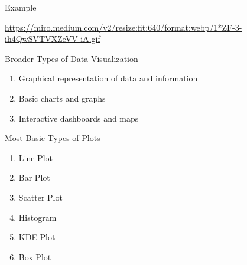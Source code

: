 \documentclass[aspectratio=169,xcolor=dvipsnames,svgnames,x11names,fleqn]{beamer}
\begin{document}
\begin{frame}{Example}

{\color{purple}\url{https://miro.medium.com/v2/resize:fit:640/format:webp/1*ZF-3-ih4QwSVTVXZeVV-iA.gif}}
\end{frame}

\begin{frame}{Broader Types of Data Visualization}
\Large
\begin{enumerate}
    \item Graphical representation of data and information
    \item Basic charts and graphs
    \item Interactive dashboards and maps
\end{enumerate}
    
\end{frame}

\begin{frame}{Most Basic Types of Plots}
    \begin{enumerate}
        \item Line Plot
        \item Bar Plot
        \item Scatter Plot
        \item Histogram
        \item KDE Plot
        \item Box Plot
    \end{enumerate}
\end{frame}
\end{document}
